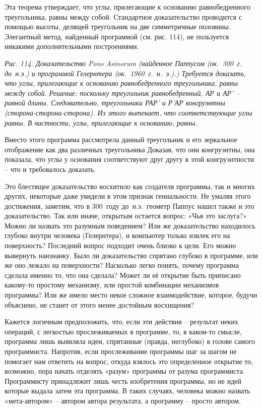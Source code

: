\documentclass[../main.tex]{subfiles}
\begin{document}
Эта теорема утверждает, что углы, прилегающие к основанию равнобедренного треугольника, равны между собой. Стандартное доказательство проводится с помощью высоты, делящей треугольник на две симметричные половины. Элегантный метод, найденный программой (см. рис. 114), не пользуется никакими дополнительными построениями.

\emph{Рис. 114. Доказательство Pons Asinorum (найденное Паппусом (ок.~300~г. до~н.э.) и программой Гелернтера (ок.~1960~г.~н.~э.).) Требуется доказать, что углы, прилегающие к основанию равнобедренного треугольника, равны между собой. Решение: поскольку треугольник равнобедренный, АР и АР' \--- равной длины. Следовательно, треугольники РАР' и Р'АР конгруэнтны (сторона-сторона-сторона). Из этого вытекает, что соответствующие углы равны. В частности, углы, прилегающие к основанию, равны.}

Вместо этого программа рассмотрела данный треугольник и его зеркальное отображение как два различных треугольника Доказав, что они конгруэнтны, она показала, что углы у основания соответствуют друг другу в этой конгруэнтности \--- что и требовалось доказать.

Это блестящее доказательство восхитило как создателя программы, так и многих других, некоторые даже увидели в этом признак гениальности. Не умаляя этого достижения, заметим, что в 300~году до~н.э.\ геометр Паппус нашел также и это доказательство. Так или иначе, открытым остается вопрос: «Чья это заслуга?» Можно ли назвать это разумным поведением? Или же доказательство находилось глубоко внутри человека (Гелернтера), и компьютер только извлек его на поверхность? Последний вопрос подходит очень близко к цели. Его можно вывернуть наизнанку. Было ли доказательство спрятано глубоко в программе, или же оно лежало на поверхности? Насколько легко понять, почему программа сделала именно то, что она сделала? Может ли её открытие быть приписано какому-то простому механизму, или простой комбинации механизмов программы? Или же имело место некое сложное взаимодействие, которое, будучи объяснено, не станет от этого менее достойным восхищения?

Кажется логичным предположить, что, если эти действия \--- результат неких операций, с легкостью прослеживаемых в программе, то, в каком-то смысле, программа лишь выявляла идеи, спрятанные (правда, неглубоко) в голове самого программиста. Напротив, если прослеживание программы шаг за шагом не помогает нам ответить на вопрос, откуда взялось это определенное открытие то, возможно, пора начать отделять «разум» программы от разума программиста. Программисту принадлежит лишь честь изобретения программы, но не идей которые выдала затем эта программа. В таких случаях, человека можно назвать «мета-автором» \--- автором автора результата, а программу \--- просто автором.
\end{document}
